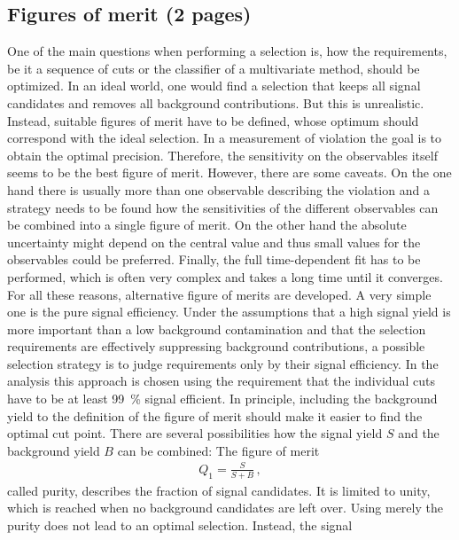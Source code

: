 
\subsection{Figures of merit (2 pages)}
\label{sec:dataanalysis:selection:fom}

One of the main questions when performing a selection is, how the
requirements, be it a sequence of cuts or the classifier of a multivariate
method, should be optimized. In an ideal world, one would find a selection
that keeps all signal candidates and removes all background contributions. But
this is unrealistic. Instead, suitable figures of merit have to be defined,
whose optimum should correspond with the ideal selection.  In a measurement of
\CP violation the goal is to obtain the optimal precision. Therefore, the
sensitivity on the \CP observables itself seems to be the best figure of
merit. However, there are some caveats. On the one hand there is usually more
than one observable describing the \CP violation and a strategy needs to be
found how the sensitivities of the different \CP observables can be combined
into a single figure of merit. On the other hand the absolute uncertainty
might depend on the central value and thus small values for the \CP
observables could be preferred. Finally, the full time-dependent fit has to be
performed, which is often very complex and takes a long time until it
converges. For all these reasons, alternative figure of merits are developed.
A very simple one is the pure signal efficiency. Under the assumptions that a
high signal yield is more important than a low background contamination and
that the selection requirements are effectively suppressing background
contributions, a possible selection strategy is to judge requirements only by
their signal efficiency. In the \BdToJPsiKS analysis this approach is chosen
using the requirement that the individual cuts have to be at least
\SI{99}{\percent} signal efficient. In principle, including the background
yield to the definition of the figure of merit should make it easier to find
the optimal cut point. There are several possibilities how the signal yield
$S$ and the background yield $B$ can be combined:
The figure of merit
\begin{align}
	Q_1 = \frac{S}{S + B}\,,
\end{align}
called purity, describes the fraction of signal candidates. It is limited to
unity, which is reached when no background candidates are left over. Using
merely the purity does not lead to an optimal selection. Instead, the signal
